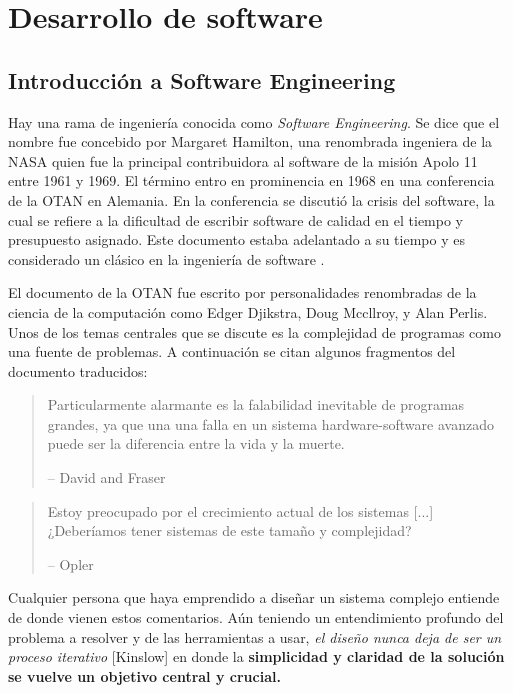 \section{Desarrollo de software}

\subsection{Introducción a Software Engineering}

Hay una rama de ingeniería conocida como \textit{Software Engineering}. Se dice que el nombre fue concebido por Margaret Hamilton, una renombrada ingeniera de la NASA quien fue la principal contribuidora al software de la misión Apolo 11 entre 1961 y 1969. El término entro en prominencia en 1968 en una conferencia de la OTAN en Alemania. En la conferencia se discutió la crisis del software, la cual se refiere a la dificultad de escribir software de calidad en el tiempo y presupuesto asignado. Este documento estaba adelantado a su tiempo y es considerado un clásico en la ingeniería de software \citep{natoSoftwareEngineering}.

\medskip

El documento de la OTAN fue escrito por personalidades renombradas de la ciencia de la computación como Edger Djikstra, Doug Mccllroy, y Alan Perlis. Unos de los temas centrales que se discute es la complejidad de programas como una fuente de problemas. A continuación se citan algunos fragmentos del documento traducidos:
\begin{quote}
    Particularmente alarmante es la falabilidad inevitable de programas grandes, ya que una una falla en un sistema hardware-software avanzado puede ser la diferencia entre la vida y la muerte.

    -- David and Fraser
\end{quote}

\begin{quote}
   Estoy preocupado por el crecimiento actual de los sistemas [...] ¿Deberíamos tener sistemas de este tamaño y complejidad?

    -- Opler
\end{quote}

Cualquier persona que haya emprendido a diseñar un sistema complejo entiende de donde vienen estos comentarios. Aún teniendo un entendimiento profundo del problema a resolver y de las herramientas a usar, \textit{el diseño nunca deja de ser un proceso iterativo} [Kinslow] en donde la \textbf{simplicidad y claridad de la solución se vuelve un objetivo central y crucial.}


